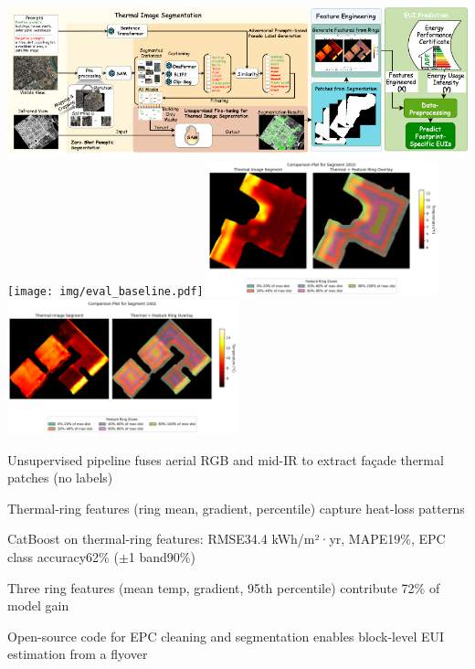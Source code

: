 \documentclass[preprint,12pt]{elsarticle}
\begin{document}
\begin{frontmatter}
\begin{graphicalabstract}
    \includegraphics[width=\textwidth]{img/Segment.png}
    \texttt{[image: img/eval\_baseline.pdf]}
    \includegraphics[width=0.5\textwidth]{img/comparison_overlay_1010.png}
    \includegraphics[width=0.5\textwidth]{img/comparison_overlay_1002.png}
\end{graphicalabstract}

\begin{highlights}
\item Unsupervised pipeline fuses aerial RGB and mid-IR to extract façade thermal patches (no labels)
\item Thermal-ring features (ring mean, gradient, percentile) capture heat-loss patterns
\item CatBoost on thermal-ring features: RMSE34.4 kWh/m²·yr, MAPE19\%, EPC class accuracy62\% ($\pm$1 band90\%)
\item Three ring features (mean temp, gradient, 95th percentile) contribute 72\% of model gain
\item Open-source code for EPC cleaning and segmentation enables block-level EUI estimation from a flyover
\end{highlights}


\end{frontmatter}
\end{document}
